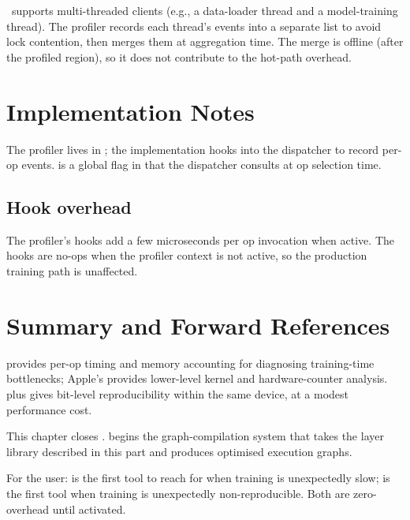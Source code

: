 \Lucid\ supports multi-threaded clients (e.g., a data-loader
thread and a model-training thread). The profiler records each
thread's events into a separate list to avoid lock contention,
then merges them at aggregation time. The merge is offline
(after the profiled region), so it does not contribute to the
hot-path overhead.

\section{Implementation Notes}
\label{sec:profiler_determinism:impl}

The profiler lives in ; the
implementation hooks into the dispatcher to record per-op
events.  is a global flag in
 that the dispatcher
consults at op selection time.

\subsection{Hook overhead}
\label{ssec:profiler_determinism:hook_overhead}

The profiler's hooks add a few microseconds per op invocation
when active. The hooks are no-ops when the profiler context is
not active, so the production training path is unaffected.

\section{Summary and Forward References}
\label{sec:profiler_determinism:summary}

 provides per-op timing and memory
accounting for diagnosing training-time bottlenecks; Apple's
 provides lower-level kernel and
hardware-counter analysis. 
plus  gives bit-level reproducibility
within the same device, at a modest performance cost.

This chapter closes .
 begins the graph-compilation system
that takes the layer library described in this part and produces
optimised execution graphs.

\begin{lucidnote}
For the user:  is the first tool to reach for when
training is unexpectedly slow;  is
the first tool when training is unexpectedly non-reproducible.
Both are zero-overhead until activated.
\end{lucidnote}
